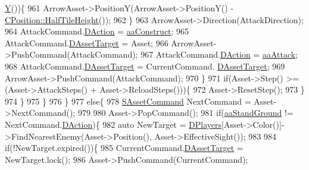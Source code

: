 \begin{DoxyCode}
{{      \hyperlink{classCPosition_a1aa8a30e2f08dda1f797736ba8c13a87}{Y}())\{
961                                 ArrowAsset->PositionY(ArrowAsset->PositionY() - 
      \hyperlink{classCPosition_a5e371060b1aa0d3d3c5df1e353e0e5fd}{CPosition::HalfTileHeight}());
962                             \}
963                             ArrowAsset->Direction(AttackDirection);
964                             AttackCommand.\hyperlink{structSAssetCommand_a8edd3b3d59a76d5514ba403bc8076a75}{DAction} = \hyperlink{GameDataTypes_8h_ab47668e651a3032cfb9c40ea2d60d670a7ef6b863f66dd7dcc95a199cd758ae1d}{aaConstruct};
965                             AttackCommand.\hyperlink{structSAssetCommand_a3d9b43f6e59c386c48c41a65448a0c39}{DAssetTarget} = Asset;
966                             ArrowAsset->PushCommand(AttackCommand);
967                             AttackCommand.\hyperlink{structSAssetCommand_a8edd3b3d59a76d5514ba403bc8076a75}{DAction} = \hyperlink{GameDataTypes_8h_ab47668e651a3032cfb9c40ea2d60d670a948eefd20b9e43d3b4cfcf613774716d}{aaAttack};
968                             AttackCommand.\hyperlink{structSAssetCommand_a3d9b43f6e59c386c48c41a65448a0c39}{DAssetTarget} = CurrentCommand.
      \hyperlink{structSAssetCommand_a3d9b43f6e59c386c48c41a65448a0c39}{DAssetTarget};
969                             ArrowAsset->PushCommand(AttackCommand);
970                         \}
971                         \textcolor{keywordflow}{if}(Asset->Step() >= (Asset->AttackSteps() + Asset->ReloadSteps()))\{
972                            Asset->ResetStep();
973                         \}
974                     \}
975                 \}
976             \}
977             \textcolor{keywordflow}{else}\{
978                 \hyperlink{structSAssetCommand}{SAssetCommand} NextCommand = Asset->NextCommand();
979                 
980                 Asset->PopCommand();
981                 \textcolor{keywordflow}{if}(\hyperlink{GameDataTypes_8h_ab47668e651a3032cfb9c40ea2d60d670abd8a4e07a8f888148ed62ddd46719af3}{aaStandGround} != NextCommand.\hyperlink{structSAssetCommand_a8edd3b3d59a76d5514ba403bc8076a75}{DAction})\{
982                     \textcolor{keyword}{auto} NewTarget = \hyperlink{classCGameModel_a524436c3560b10e1c6d6fdd0b66565dc}{DPlayers}[Asset->Color()]->FindNearestEnemy(Asset->Position(), 
      Asset->EffectiveSight());
983 
984                     \textcolor{keywordflow}{if}(!NewTarget.expired())\{
985                         CurrentCommand.\hyperlink{structSAssetCommand_a3d9b43f6e59c386c48c41a65448a0c39}{DAssetTarget} = NewTarget.lock();
986                         Asset->PushCommand(CurrentCommand);
}}
\end{DoxyCode}
